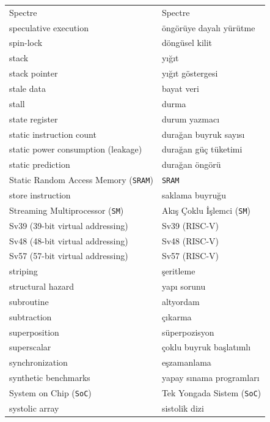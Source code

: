 {\begin{longtable}{@{}p{7.6cm}p{7.6cm}@{}}
Spectre & Spectre \\
speculative execution & öngörüye dayalı yürütme \\
spin-lock & döngüsel kilit \\
stack & yığıt \\
stack pointer & yığıt göstergesi \\
stale data & bayat veri \\
stall & durma \\
state register & durum yazmacı \\
static instruction count & durağan buyruk sayısı \\
static power consumption (leakage) & durağan güç tüketimi \\
static prediction & durağan öngörü \\
Static Random Access Memory (\texttt{SRAM}) & \texttt{SRAM} \\
store instruction & saklama buyruğu \\
Streaming Multiprocessor (\texttt{SM}) & Akış Çoklu İşlemci (\texttt{SM}) \\
Sv39 (39-bit virtual addressing) & Sv39 (RISC-V) \\
Sv48 (48-bit virtual addressing) & Sv48 (RISC-V) \\
Sv57 (57-bit virtual addressing) & Sv57 (RISC-V) \\
striping & şeritleme \\
structural hazard & yapı sorunu \\
subroutine & altyordam \\
subtraction & çıkarma \\
superposition & süperpozisyon \\
superscalar & çoklu buyruk başlatımlı \\
synchronization & eşzamanlama \\
synthetic benchmarks & yapay sınama programları \\
System on Chip (\texttt{SoC}) & Tek Yongada Sistem (\texttt{SoC}) \\
systolic array & sistolik dizi \\


\end{longtable}}

